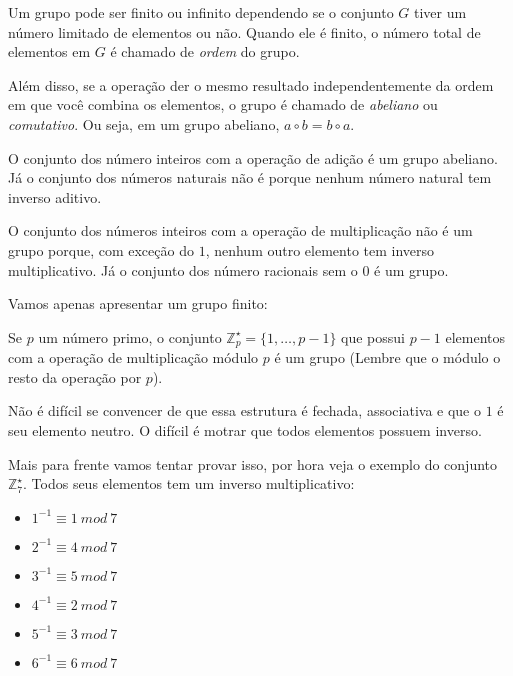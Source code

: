Um grupo pode ser finito ou infinito dependendo se o conjunto $G$ tiver um número limitado de elementos ou não.
Quando ele é finito, o número total de elementos em $G$ é chamado de {\em ordem} do grupo.

Além disso, se a operação der o mesmo resultado independentemente da ordem em que você combina os elementos, o grupo é chamado de {\em abeliano} ou {\em comutativo}.
Ou seja, em um grupo abeliano, $a \circ b = b \circ a$.

O conjunto dos número inteiros com a operação de adição é um grupo abeliano.
Já o conjunto dos números naturais não é porque nenhum número natural tem inverso aditivo.

O conjunto dos números inteiros com a operação de multiplicação não é um grupo porque, com exceção do $1$, nenhum outro elemento tem inverso multiplicativo.
Já o conjunto dos número racionais sem o $0$ é um grupo.

Vamos apenas apresentar um grupo finito:
\begin{example}
  Se $p$ um número primo, o conjunto $\mathbb{Z}_p^\star = \{ 1, \dots, p-1\}$ que possui $p - 1$ elementos com a operação de multiplicação módulo $p$ é um grupo (Lembre que o módulo o resto da operação por $p$).

    Não é difícil se convencer de que essa estrutura é fechada, associativa e que o $1$ é seu elemento neutro.
    O difícil é motrar que todos elementos possuem inverso.

    Mais para frente vamos tentar provar isso, por hora veja o exemplo do conjunto $\mathbb{Z}_7^\star$.
    Todos seus elementos tem um inverso multiplicativo:
    
    \begin{multicols}{2}
    \begin{itemize}
      \item[] $1^{-1} \equiv 1\ mod\ 7$
      \item[] $2^{-1} \equiv 4\ mod\ 7$
      \item[] $3^{-1} \equiv 5\ mod\ 7$
    \end{itemize}
    \begin{itemize}
      \item[] $4^{-1} \equiv 2\ mod\ 7$
      \item[] $5^{-1} \equiv 3\ mod\ 7$
      \item[] $6^{-1} \equiv 6\ mod\ 7$
    \end{itemize}
  \end{multicols}
\end{example}


